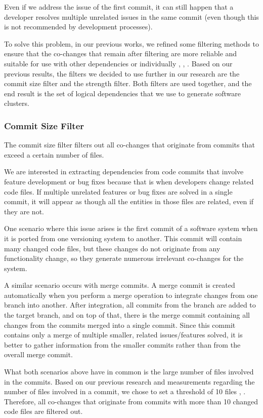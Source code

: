\documentclass{ieeeaccess}
\begin{document}
Even if we address the issue of the first commit, it can still happen that a developer resolves multiple unrelated issues in the same commit (even though this is not recommended by development processes).

To solve this problem, in our previous works, we refined some filtering methods to ensure that the co-changes that remain after filtering are more reliable and suitable for use with other dependencies or individually \cite{b4}, \cite{b5}, \cite{b6}. Based on our previous results, the filters we decided to use further in our research are the commit size filter and the strength filter. Both filters are used together, and the end result is the set of logical dependencies that we use to generate software clusters.

\subsubsection{Commit Size Filter}

The commit size filter filters out all co-changes that originate from commits that exceed a certain number of files.

We are interested in extracting dependencies from code commits that involve feature development or bug fixes because that is when developers change related code files. If multiple unrelated features or bug fixes are solved in a single commit, it will appear as though all the entities in those files are related, even if they are not.

One scenario where this issue arises is the first commit of a software system when it is ported from one versioning system to another. This commit will contain many changed code files, but these changes do not originate from any functionality change, so they generate numerous irrelevant co-changes for the system.

A similar scenario occurs with merge commits. A merge commit is created automatically when you perform a merge operation to integrate changes from one branch into another. After integration, all commits from the branch are added to the target branch, and on top of that, there is the merge commit containing all changes from the commits merged into a single commit. Since this commit contains only a merge of multiple smaller, related issues/features solved, it is better to gather information from the smaller commits rather than from the overall merge commit.

What both scenarios above have in common is the large number of files involved in the commits. Based on our previous research and measurements regarding the number of files involved in a commit, we chose to set a threshold of 10 files \cite{b4}, \cite{b5}. Therefore, all co-changes that originate from commits with more than 10 changed code files are filtered out.
\end{document}
